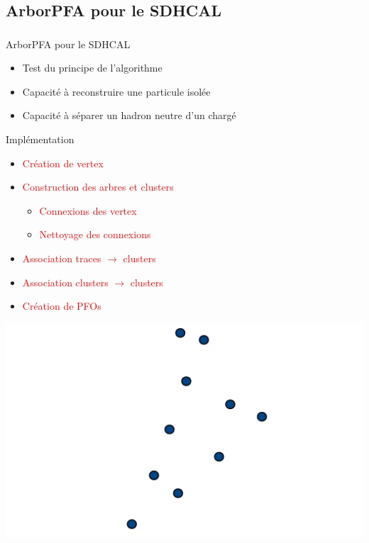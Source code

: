 \documentclass[8pt]{beamer}
\begin{document}
  \subsection{ArborPFA pour le SDHCAL}

  \begin{frame}
  \frametitle{\secname}
  \framesubtitle{\subsecname}
    \begin{block}{ArborPFA pour le SDHCAL}
      \begin{itemize}
        \item Test du principe de l'algorithme
        \item Capacité à reconstruire une particule isolée
        \item Capacité à séparer un hadron neutre d'un chargé
      \end{itemize}
    \end{block}
    \pause
    \begin{minipage}{0.6\linewidth}
      \begin{block}{Implémentation}
        \begin{itemize}
          \item \textcolor<2>{red}{Création de vertex }
          \item \textcolor<3,7>{red}{Construction des arbres et clusters }
          \begin{itemize}
            \item \textcolor<3,7>{red}{Connexions des vertex}
            \item \textcolor<3,7>{red}{Nettoyage des connexions}
          \end{itemize}
          \item \textcolor<4>{red}{Association traces $\rightarrow$ clusters}
          \item \textcolor<5>{red}{Association clusters $\rightarrow$ clusters}
          \item \textcolor<6>{red}{Création de PFOs}
        \end{itemize}
      \end{block}
    \end{minipage}
    \begin{minipage}{0.39\linewidth}
      \begin{overprint}
         \centering \includegraphics[width=0.8\linewidth]{VertexCreationIntro.pdf}

\end{overprint}
\end{minipage}
\end{frame}
\end{document}
